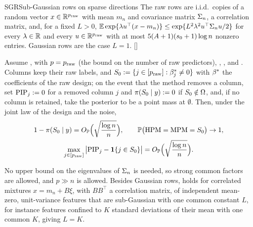 \begin{assumption}{SGR}{Sub-Gaussian rows on sparse directions}
The raw rows are i.i.d.\ copies of a random vector $x\in\mathbb{R}^{p_{\mathrm{raw}}}$ with mean $m_n$ and covariance matrix $\Sigma_n$, a correlation
matrix, and, for a fixed $L>0$, $\operatorname{\mathbb{E}}\exp\{\lambda u^\top(x-m_n)\}\le\exp\{L^2\lambda^2u^\top\Sigma_n u/2\}$ for every $\lambda\in\mathbb{R}$
and every $u\in\mathbb{R}^{p_{\mathrm{raw}}}$ with at most $5(A+1)(s_0+1)\log n$ nonzero entries. Gaussian rows  are the case
$L=1$.
\hfill []
\end{assumption}

\begin{theorem}\label{thm:post-random}
Assume ,  with $p=p_{\mathrm{raw}}$ (the bound on the number of raw predictors), , ,  and
. Columns keep their raw labels, and $S_0:=\{j\in[p_{\mathrm{raw}}]:\beta^*_j\neq0\}$ with $\beta^*$ the coefficients of the raw design; on the event that the method removes a column, set $\mathrm{PIP}_j:=0$ for a removed
column $j$ and $\pi(S_0\mid y):=0$ if $S_0\notin\Omega$, and, if no column is retained, take the posterior to be a point mass at
$\emptyset$. Then, under the joint law of the design and the noise,
\begin{gather}
  1-\pi(S_0\mid y)=O_{\mathbb{P}}\Big(\sqrt{\frac{\log n}{n}}\Big),\qquad \mathbb{P}\big(\mathrm{HPM}=\mathrm{MPM}=S_0\big)\to1,\label{eq:post-random}\\
  \max_{j\in[p_{\mathrm{raw}}]}\big|\mathrm{PIP}_j-\mathbf{1}\{j\in S_0\}\big|=O_{\mathbb{P}}\Big(\sqrt{\frac{\log n}{n}}\Big).\nonumber
\end{gather}
\end{theorem}



No upper bound on the eigenvalues of $\Sigma_n$ is needed, so strong common factors are allowed, and $p\gg n$ is allowed.
Besides Gaussian rows,  holds for correlated mixtures $x=m_n+B\xi$, with $BB^\top$ a correlation matrix, of independent mean-zero, unit-variance
features that are sub-Gaussian with one common constant $L$, for instance features confined to $K$ standard deviations of
their mean with one common $K$, giving $L=K$.

